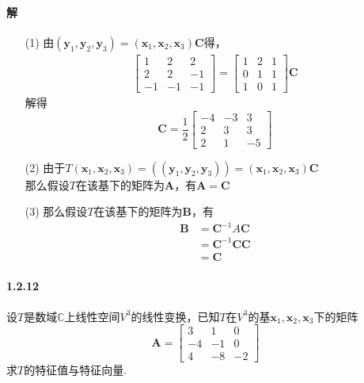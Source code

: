 \documentclass[12pt, a4paper, oneside, fontset=none]{ctexart}
\begin{document}
\paragraph*{解}
\begin{enumerate}
    \item[(1)] 由$(\bm{y}_1, \bm{y}_2, \bm{y}_3) = (\bm{x}_1, \bm{x}_2, \bm{x}_3) \bm{C}$得，
        \begin{gather*}
            \begin{bmatrix}
                1  & 2  & 2  \\
                2  & 2  & -1 \\
                -1 & -1 & -1
            \end{bmatrix} = \begin{bmatrix}
                1 & 2 & 1 \\
                0 & 1 & 1 \\
                1 & 0 & 1
            \end{bmatrix} \bm{C}
        \end{gather*}
        解得
        \[
            \bm{C} = \dfrac{1}{2} \begin{bmatrix}
                -4 & -3 & 3  \\
                2  & 3  & 3  \\
                2  & 1  & -5
            \end{bmatrix}
        \]
    \item[(2)] 由于$T(\bm{x}_1, \bm{x}_2, \bm{x}_3) = ((\bm{y}_1, \bm{y}_2, \bm{y}_3)) = (\bm{x}_1, \bm{x}_2, \bm{x}_3) \bm{C}$ \\
        那么假设$T$在该基下的矩阵为$\bm{A}$，有$\bm{A} = \bm{C}$
    \item[(3)] 那么假设$T$在该基下的矩阵为$\bm{B}$，有
        \begin{align*}
            \bm{B} & = \bm{C}^{-1} A \bm{C} \\
                   & = \bm{C}^{-1}\bm{CC}   \\
                   & = \bm{C}
        \end{align*}
\end{enumerate}

\paragraph*{1.2.12} 设$T$是数域$\mathbb{C}$上线性空间$V^3$的线性变换，已知$T$在$V^3$的基$\bm{x}_1, \bm{x}_2, \bm{x}_3$下的矩阵
\[
    \bm{A} = \begin{bmatrix}
        3  & 1  & 0  \\
        -4 & -1 & 0  \\
        4  & -8 & -2
    \end{bmatrix}
\]
求$T$的特征值与特征向量.
\end{document}

